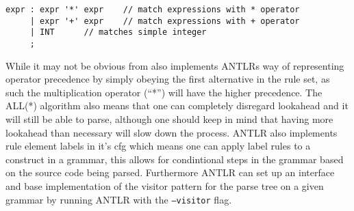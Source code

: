 \begin{lstlisting}[caption=An ambiguous rule for expr,frame=tlrb,label={lst:amb}]
expr : expr '*' expr 	// match expressions with * operator
     | expr '+' expr 	// match expressions with + operator
     | INT 		// matches simple integer
     ;
\end{lstlisting}
While it may not be obvious from  also implements ANTLRs way of representing operator precedence by simply obeying the first alternative in the rule set, as such the multiplication operator (``*'') will have the higher precedence.
The ALL(*) algorithm also means that one can completely disregard lookahead and it will still be able to parse, although one should keep in mind that having more lookahead than necessary will slow down the process.
ANTLR also implements rule element labels in it's \gls{cfg} which means one can apply label rules to a construct in a grammar, this allows for condintional steps in the grammar based on the source code being parsed.
Furthermore ANTLR can set up an interface and base implementation of the visitor pattern for the parse tree on a given grammar by running ANTLR with the \texttt{--visitor} flag.\citep{ALLSTAR, LLSTAR, ANTLR4_Book}





